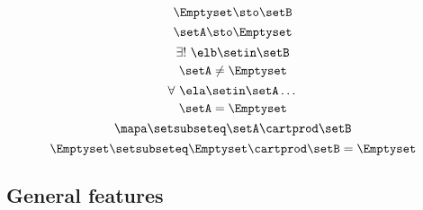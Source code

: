 \begin{forslides}
    \begin{equation}
        \label{eq:slides_session2_114}
        \Emptyset \sto \setB
    \end{equation}
    \begin{equation}
        \label{eq:slides_session2_115}
        \setA \sto \Emptyset
    \end{equation}
    \begin{equation}
        \label{eq:slides_session2_116}
        \exists ! \ \elb \setin\setB
    \end{equation}
    \begin{equation}
        \label{eq:slides_session2_117}
        \setA \neq \Emptyset
    \end{equation}
    \begin{equation}
        \label{eq:slides_session2_118}
        \forall \ \ela \setin\setA \dots
    \end{equation}
    \begin{equation}
        \label{eq:slides_session2_119}
        \setA = \Emptyset
    \end{equation}
    \begin{equation}
        \label{eq:slides_session2_120}
        \mapa \setsubseteq \setA \cartprod \setB
    \end{equation}
    \begin{equation}
        \label{eq:slides_session2_121}
        \Emptyset \setsubseteq \Emptyset \cartprod \setB = \Emptyset
    \end{equation}

    \subsection{General features}


\end{forslides}
